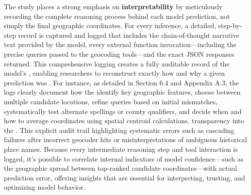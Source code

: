 The study places a strong emphasis on \textbf{interpretability} by
meticulously recording the complete reasoning process behind each model
prediction, not simply the final geographic coordinates. For every
inference, a detailed, step-by-step record is captured and logged that
includes the chain-of-thought narrative text provided by the model,
every external function invocation---including the precise queries
passed to the geocoding tools---and the exact JSON responses returned.
This comprehensive logging creates a fully auditable record of the
model's \DIFdelbegin {}\DIFdelend \DIFaddbegin {}\DIFaddend , enabling researchers to reconstruct exactly how
and why a given prediction was \DIFdelbegin {}\DIFdelend \DIFaddbegin {}\DIFaddend . For instance, as detailed in
Section 6.4 and Appendix A.3, the logs clearly document how the
\DIFdelbegin {}\DIFdelend \DIFaddbegin {}\DIFaddend identify key geographic features, choose between multiple
candidate locations, refine queries based on initial mismatches,
systematically test alternate spellings or county qualifiers, and decide
when and how to average coordinates using spatial centroid calculations.
\DIFdelbegin {}\DIFdelend \DIFaddbegin {}\DIFaddend transparency into the \DIFdelbegin {}\DIFdelend \DIFaddbegin {}\DIFaddend . This explicit audit trail \DIFdelbegin {}\DIFdelend \DIFaddbegin {}\DIFaddend highlighting systematic errors such as
cascading failures after incorrect geocoder hits or misinterpretations
of ambiguous historical place names. Because every intermediate
reasoning step and tool interaction is logged, it's possible to
correlate internal indicators of model confidence---such as the
geographic spread between top-ranked candidate coordinates---with actual
prediction error, offering insights that are essential for interpreting,
trusting, and optimizing model behavior.

